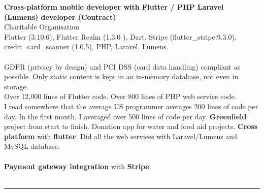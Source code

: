 \documentclass{article}
\begin{document}
\textbf{ Cross-platform mobile developer with Flutter / PHP Laravel (Lumens) developer (Contract) } \\
Charitable Organisation %
\\
Flutter (3.10.6), Flutter Realm (1.3.0 ), Dart, Stripe (flutter\_stripe:9.3.0), credit\_card\_scanner (1.0.5), PHP, Laravel. Lumens.\\
\\
GDPR (privacy by design) and PCI DSS (card data handling) compliant as possible. Only static content is kept in an in-memory database, not even in storage. \\
Over 12,000 lines of Flutter code. Over 800 lines of PHP web service code. \\
I read somewhere that the average US programmer averages 200 lines of code per day. In the first month, I averaged over 500 lines of code per day.
\textbf{Greenfield} project from start to finish. Donation app for water and food aid projects. \textbf{Cross platform} with \textbf{flutter}. Did all the web services with Laravel/Lumens and MySQL database. \\
\\ 
\textbf{Payment gateway integration} with \textbf{Stripe}. \\
\\


\noindent\hfil\rule{0.5\textwidth}{.4pt}\hfil
\\
\end{document}

